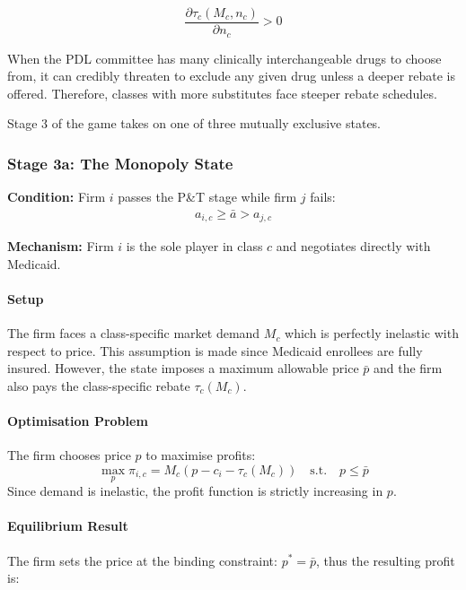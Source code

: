 \documentclass[12pt]{article}
\begin{document}
\begin{equation} \label{eq:tau_steepness}
\frac{\partial \tau_c(M_c, n_c)}{\partial n_c} > 0
\end{equation}

When the PDL committee has many clinically interchangeable drugs to choose from, it can credibly threaten to exclude any given drug unless a deeper rebate is offered. Therefore, classes with more substitutes face steeper rebate schedules.

Stage 3 of the game takes on one of three mutually exclusive states.

\subsubsection{Stage 3a: The Monopoly State}

\textbf{Condition:} Firm $i$ passes the P\&T stage while firm $j$ fails:
\begin{align*}
    a_{i,c} \geq \bar{a} > a_{j,c}
\end{align*}

\textbf{Mechanism:} Firm $i$ is the sole player in class $c$ and negotiates directly with Medicaid.

\paragraph{Setup} 
The firm faces a class-specific market demand $M_c$ which is perfectly inelastic with respect to price. This assumption is made since Medicaid enrollees are fully insured. However, the state imposes a maximum allowable price $\bar{p}$ and the firm also pays the class-specific rebate $\tau_c(M_c)$.

\paragraph{Optimisation Problem}
The firm chooses price $p$ to maximise profits:
\begin{equation}
    \max_{p} \pi_{i,c} = M_c(p - c_i - \tau_c(M_c)) \quad \text{s.t.} \quad p \le \bar{p}
\end{equation}
Since demand is inelastic, the profit function is strictly increasing in $p$.

\paragraph{Equilibrium Result}
The firm sets the price at the binding constraint: $p^* = \bar{p}$, thus the resulting profit is:
\end{document}
